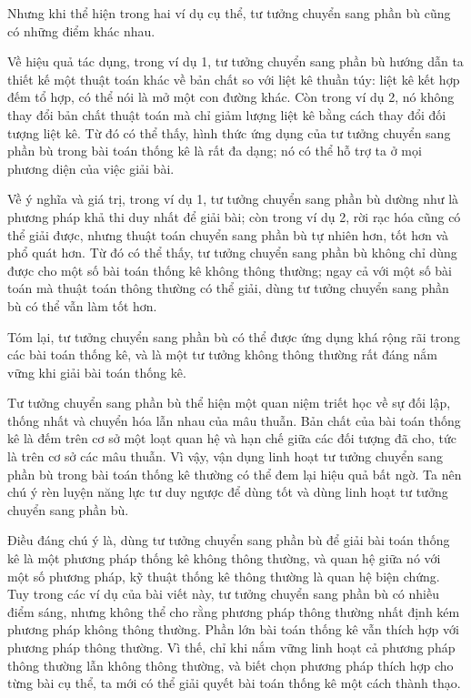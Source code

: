 \documentclass[11pt]{article}
\begin{document}
Nhưng khi thể hiện trong hai ví dụ cụ thể, tư tưởng chuyển sang phần bù
cũng có những điểm khác nhau.

Về hiệu quả tác dụng, trong ví dụ 1, tư tưởng chuyển sang phần bù hướng
dẫn ta thiết kế một thuật toán khác về bản chất so với liệt kê thuần túy:
liệt kê kết hợp đếm tổ hợp, có thể nói là mở một con đường khác. Còn
trong ví dụ 2, nó không thay đổi bản chất thuật toán mà chỉ giảm lượng
liệt kê bằng cách thay đổi đối tượng liệt kê. Từ đó có thể thấy, hình
thức ứng dụng của tư tưởng chuyển sang phần bù trong bài toán thống kê là
rất đa dạng; nó có thể hỗ trợ ta ở mọi phương diện của việc giải bài.

Về ý nghĩa và giá trị, trong ví dụ 1, tư tưởng chuyển sang phần bù dường
như là phương pháp khả thi duy nhất để giải bài; còn trong ví dụ 2, rời
rạc hóa cũng có thể giải được, nhưng thuật toán chuyển sang phần bù tự
nhiên hơn, tốt hơn và phổ quát hơn. Từ đó có thể thấy, tư tưởng chuyển
sang phần bù không chỉ dùng được cho một số bài toán thống kê không thông
thường; ngay cả với một số bài toán mà thuật toán thông thường có thể
giải, dùng tư tưởng chuyển sang phần bù có thể vẫn làm tốt hơn.

Tóm lại, tư tưởng chuyển sang phần bù có thể được ứng dụng khá rộng rãi
trong các bài toán thống kê, và là một tư tưởng không thông thường rất
đáng nắm vững khi giải bài toán thống kê.

Tư tưởng chuyển sang phần bù thể hiện một quan niệm triết học về sự đối
lập, thống nhất và chuyển hóa lẫn nhau của mâu thuẫn. Bản chất của bài
toán thống kê là đếm trên cơ sở một loạt quan hệ và hạn chế giữa các đối
tượng đã cho, tức là trên cơ sở các mâu thuẫn. Vì vậy, vận dụng linh hoạt
tư tưởng chuyển sang phần bù trong bài toán thống kê thường có thể đem
lại hiệu quả bất ngờ. Ta nên chú ý rèn luyện năng lực tư duy ngược để
dùng tốt và dùng linh hoạt tư tưởng chuyển sang phần bù.

Điều đáng chú ý là, dùng tư tưởng chuyển sang phần bù để giải bài toán
thống kê là một phương pháp thống kê không thông thường, và quan hệ giữa
nó với một số phương pháp, kỹ thuật thống kê thông thường là quan hệ biện
chứng. Tuy trong các ví dụ của bài viết này, tư tưởng chuyển sang phần bù
có nhiều điểm sáng, nhưng không thể cho rằng phương pháp thông thường
nhất định kém phương pháp không thông thường. Phần lớn bài toán thống kê
vẫn thích hợp với phương pháp thông thường. Vì thế, chỉ khi nắm vững linh
hoạt cả phương pháp thông thường lẫn không thông thường, và biết chọn
phương pháp thích hợp cho từng bài cụ thể, ta mới có thể giải quyết bài
toán thống kê một cách thành thạo.
\end{document}
